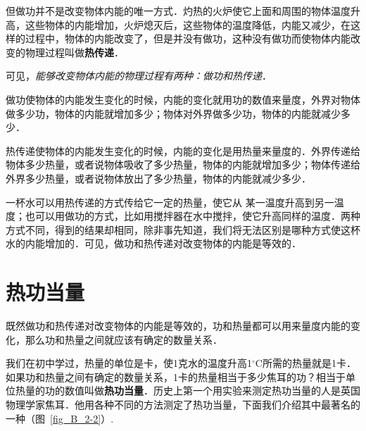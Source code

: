 但做功并不是改变物体内能的唯一方式．灼热的火炉使它上面和周围的物体温度升高，这些物体的内能增加，火炉熄灭后，这些物体的温度降低，内能又减少，在这样的过程中，物体的内能改变了，但是并没有做功，这种没有做功而使物体内能改变的物理过程叫做\textbf{热传递}．

可见，\textit{能够改变物体内能的物理过程有两种：做功和热传递}．

做功使物体的内能发生变化的时候，内能的变化就用功的数值来量度，外界对物体做多少功，物体的内能就增加多少；物体对外界做多少功，物体的内能就减少多少．

热传递使物体的内能发生变化的时候，内能的变化是用热量来量度的．外界传递给物体多少热量，或者说物体吸收了多少热量，物体的内能就增加多少；物体传递给外界多少热量，或者说物体放出了多少热量，物体的内能就减少多少．

一杯水可以用热传递的方式传给它一定的热量，使它从
某一温度升高到另一温度；也可以用做功的方式，比如用搅拌器在水中搅拌，使它升高同样的温度．两种方式不同，得到的结果却相同，除非事先知道，我们将无法区别是哪种方式使这杯水的内能增加的．可见，做功和热传递对改变物体的内能是等效的．

\section{热功当量}
既然做功和热传递对改变物体的内能是等效的，功和热量都可以用来量度内能的变化，那么功和热量之间就应该有确定的数量关系．

我们在初中学过，热量的单位是卡，使1克水的温度升高1$^\circ$C所需的热量就是1卡．如果功和热量之间有确定的数量关系，1卡的热量相当于多少焦耳的功？相当于单位热量的功的数值叫做\textbf{热功当量}．历史上第一个用实验来测定热功当量的人是英国物理学家焦耳．他用各种不同的方法测定了热功当量，下面我们介绍其中最著名的一种（图~\ref{fig_B_2-2}）.

